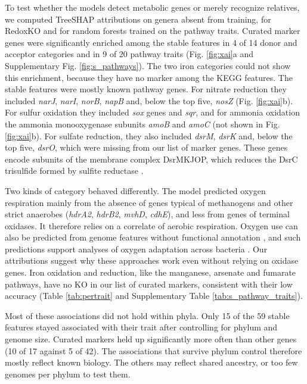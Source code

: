 \documentclass[10pt,a4paper,onecolumn]{article}
\begin{document}
To test whether the models detect metabolic genes or merely recognize
relatives, we computed TreeSHAP attributions on genera absent from
training, for RedoxKO and for random forests trained on the pathway
traits. Curated marker genes were significantly enriched among the
stable features in 4 of 14 donor and acceptor categories and in 9 of 20
pathway traits (Fig. \ref{fig:xai}a and Supplementary Fig.
\ref{fig:s_pathways}). The two iron categories could not show this
enrichment, because they have no marker among the KEGG features. The
stable features were mostly known pathway genes. For nitrate reduction
they included \emph{narJ}, \emph{narI}, \emph{norB}, \emph{napB} and,
below the top five, \emph{nosZ} (Fig. \ref{fig:xai}b). For sulfur
oxidation they included \emph{sox} genes and \emph{sqr}, and for ammonia
oxidation the ammonia monooxygenase subunits \emph{amoB} and \emph{amoC}
(not shown in Fig. \ref{fig:xai}b). For sulfate reduction, they also
included \emph{dsrM}, \emph{dsrK} and, below the top five, \emph{dsrO},
which were missing from our list of marker genes. These genes encode
subunits of the membrane complex DsrMKJOP, which reduces the DsrC
trisulfide formed by sulfite reductase \autocite{Santos2015}.

Two kinds of category behaved differently. The model predicted oxygen
respiration mainly from the absence of genes typical of methanogens and
other strict anaerobes (\emph{hdrA2}, \emph{hdrB2}, \emph{mvhD},
\emph{cdhE}), and less from genes of terminal oxidases. It therefore
relies on a correlate of aerobic respiration. Oxygen use can also be
predicted from genome features without functional annotation
\autocite{Flamholz2024}, and such predictions support analyses of oxygen
adaptation across bacteria \autocite{Davin2025}. Our attributions
suggest why these approaches work even without relying on oxidase genes.
Iron oxidation and reduction, like the manganese, arsenate and fumarate
pathways, have no KO in our list of curated markers, consistent with
their low accuracy (Table \ref{tab:pertrait} and Supplementary Table
\ref{tab:s_pathway_traits}).

Most of these associations did not hold within phyla. Only 15 of the 59
stable features stayed associated with their trait after controlling for
phylum and genome size. Curated markers held up significantly more often
than other genes (10 of 17 against 5 of 42). The associations that
survive phylum control therefore mostly reflect known biology. The
others may reflect shared ancestry, or too few genomes per phylum to
test them.
\end{document}
